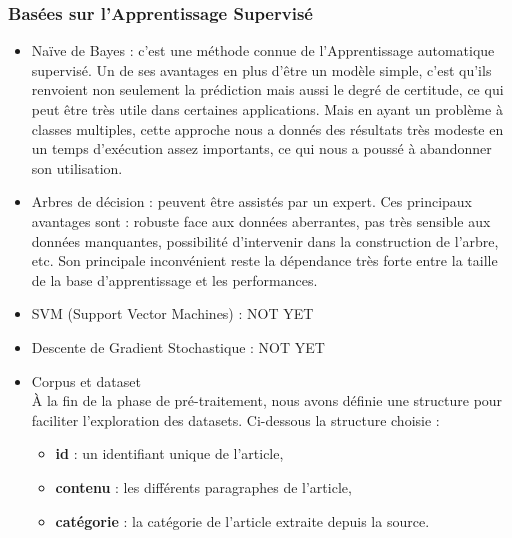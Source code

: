    \subsubsection{Basées sur l'Apprentissage Supervisé}
        \begin{itemize}
            \item{Naïve de Bayes : }
            c'est une méthode connue de l'Apprentissage automatique supervisé. Un de ses avantages en plus d'être un modèle simple, c'est qu'ils renvoient non seulement la prédiction mais aussi le degré de certitude, ce qui peut être très utile dans certaines applications. Mais en ayant un problème à classes multiples, cette approche nous a donnés des résultats très modeste en un temps d'exécution assez importants, ce qui nous a poussé à abandonner son utilisation.\\
            
            \item{Arbres de décision : }
            peuvent être assistés par un expert. Ces principaux avantages sont : robuste face aux données aberrantes, pas très sensible aux données manquantes, possibilité d’intervenir dans la construction de l’arbre, etc. Son principale inconvénient reste la dépendance très forte entre la taille de la base d’apprentissage et les performances.\\
            
            \item{SVM (Support Vector Machines) : }
            NOT YET
            
            \item{Descente de Gradient Stochastique : }
            NOT YET
        \end{itemize}

        \begin{itemize}[leftmargin=*, label={}]
            \item{Corpus et dataset}\\
                À la fin de la phase de pré-traitement, nous avons définie une structure pour faciliter l'exploration des datasets. Ci-dessous la structure choisie :
                \begin{itemize}
                   \item{\textbf{id} : }un identifiant unique de l'article,
                   \item{\textbf{contenu} : }les différents paragraphes de l'article,
                   \item{\textbf{catégorie} : }la catégorie de l'article extraite depuis la source.
                \end{itemize}
        \end{itemize}

